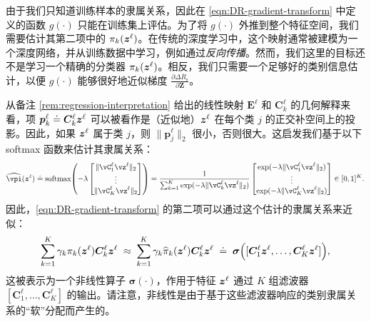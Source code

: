 \documentclass[../../book-main_zh.tex]{subfiles}
\begin{document}
由于我们只知道训练样本的隶属关系，因此在 \eqref{eqn:DR-gradient-transform} 中定义的函数 $g(\cdot)$ 只能在训练集上评估。为了将 $g(\cdot)$ 外推到整个特征空间，我们需要估计其第二项中的 $\pi_k(\bm{z}^\ell)$。在传统的深度学习中，这个映射通常被建模为一个深度网络，并从训练数据中学习，例如通过{\em 反向传播}。然而，我们这里的目标还不是学习一个精确的分类器 $\pi_{k}(\bm{z}^\ell)$。相反，我们只需要一个足够好的类别信息估计，以便 $g(\cdot)$ 能够很好地近似梯度 $\frac{\partial \Delta R_{\epsilon}}{\partial \bm Z}$。



从备注 \ref{rem:regression-interpretation} 给出的线性映射 $\bm E^\ell$ 和 $\bm C_k^\ell$ 的几何解释来看，项 $\bm p_{k}^{\ell} \doteq \bm C^{\ell}_k \bm{z}^{\ell}$ 可以被看作是（近似地）$\bm{z}^{\ell}$ 在每个类 $j$ 的正交补空间上的投影。因此，如果 $\bm{z}^\ell$ 属于类 $j$，则 $\|\bm p_{j}^{\ell}\|_2$ 很小，否则很大。这启发我们基于以下 softmax 函数来估计其隶属关系：
\begin{equation}
    \widehat{\vpi}(\z^\ell) \doteq \softmax\rp{-\lambda\mat{\norm{\vC^{\ell}_{1}\vz^{\ell}}_{2} \\ \vdots \\ \norm{\vC^{\ell}_{K}\vz^{\ell}}_{2}}} = \frac{1}{\sum_{k = 1}^{K}\exp(-\lambda \norm{\vC^{\ell}_{k}\vz^{\ell}}_{2})}\mat{\exp(-\lambda\norm{\vC^{\ell}_{1}\vz^{\ell}}_{2}) \\ \vdots \\ \exp(-\lambda\norm{\vC^{\ell}_{K}\vz^{\ell}}_{2})} \in [0,1]^{K}.
\end{equation}
因此，\eqref{eqn:DR-gradient-transform} 的第二项可以通过这个估计的隶属关系来近似：
\begin{align}
\sum_{k=1}^K \gamma_{k} \pi_k(\bm{z}^\ell)\bm C_{k}^{\ell}  \bm{z}^{\ell} 
\; \approx \;  \sum_{k=1}^K \gamma_{k} \widehat{\pi}_k(\bm{z}^\ell)  \bm{C}^{\ell}_k  \bm{z}^{\ell} 
\; \doteq \; \bm \sigma\Big([\bm{C}^{\ell}_{1} \bm{z}^{\ell}, \dots, \bm{C}^{\ell}_{K} \bm{z}^{\ell}]\Big),
\label{eqn:soft-residual}
\end{align}
这被表示为一个非线性算子 $\bm \sigma(\cdot)$，作用于特征 $\bm{z}^\ell$ 通过 $K$ 组滤波器 $[\bm{C}^{\ell}_{1}, \dots, \bm{C}^{\ell}_{K}]$ 的输出。请注意，非线性是由于基于这些滤波器响应的类别隶属关系的“软”分配而产生的。
\end{document}
